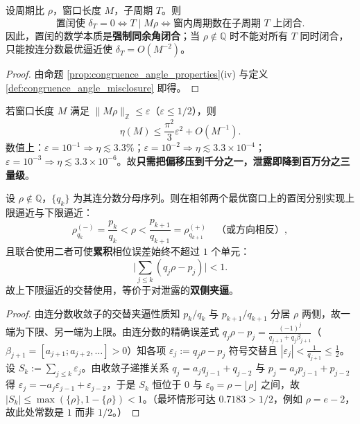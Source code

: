 \begin{theorem}[置闰即同余角闭合]\label{thm:intercalation_congruence_closure}
设周期比 $\rho$，窗口长度 $M$，子周期 $T$。则
\[
\text{置闰使 }\delta_T=0
\iff
T\mid M\rho
\iff
\text{窗内周期数在子周期 }T\text{ 上闭合}.
\]
因此，置闰的数学本质是\textbf{强制同余角闭合}；当 $\rho\notin\mathbb{Q}$ 时不能对所有 $T$ 同时闭合，只能按连分数最优逼近使 $\delta_T=O(M^{-2})$。
\end{theorem}

\begin{proof}
由命题 \ref{prop:congruence_angle_properties}(iv) 与定义 \ref{def:congruence_angle_misclosure} 即得。
\end{proof}

\begin{corollary}[泄露抑制的充分条件]\label{cor:intercalation_suppression_sufficient}
若窗口长度 $M$ 满足 $\|M\rho\|_{\mathbb{Z}}\le\varepsilon$（$\varepsilon\le1/2$），则
\[
\eta(M)\le\frac{\pi^2}{3}\varepsilon^2+O(M^{-1}).
\]
数值上：$\varepsilon=10^{-1}\Rightarrow\eta\lesssim3.3\%$；$\varepsilon=10^{-2}\Rightarrow\eta\lesssim3.3\times10^{-4}$；$\varepsilon=10^{-3}\Rightarrow\eta\lesssim3.3\times10^{-6}$。故\textbf{只需把偏移压到千分之一，泄露即降到百万分之三量级}。
\end{corollary}

\begin{proposition}[上限逼近与下限逼近的联合抑制]\label{prop:optimal_joint_suppression}
设 $\rho\notin\mathbb{Q}$，$\{q_k\}$ 为其连分数分母序列。则在相邻两个最优窗口上的置闰分别实现上限逼近与下限逼近：
\[
\rho^{(-)}_{q_k}=\frac{p_k}{q_k}<\rho<\frac{p_{k+1}}{q_{k+1}}=\rho^{(+)}_{q_{k+1}}
\quad\text{（或方向相反）},
\]
且联合使用二者可使\textbf{累积}相位误差始终不超过 $1$ 个单元：
\[
\Big|\sum_{j\le k}(q_j\rho-p_j)\Big|<1 .
\]
故上下限逼近的交替使用，等价于对泄露的\textbf{双侧夹逼}。
\end{proposition}

\begin{proof}
由连分数收敛子的交替夹逼性质知 $p_k/q_k$ 与 $p_{k+1}/q_{k+1}$ 分居 $\rho$ 两侧，故一端为下限、另一端为上限。由连分数的精确误差式 $q_j\rho-p_j=\frac{(-1)^j}{q_{j+1}+q_j\beta_{j+1}}$（$\beta_{j+1}=[a_{j+1};a_{j+2},\dots]>0$）知各项 $\varepsilon_j:=q_j\rho-p_j$ 符号交替且 $|\varepsilon_j|<\frac1{q_{j+1}}\le\frac12$。设 $S_k:=\sum_{j\le k}\varepsilon_j$。由收敛子递推关系 $q_j=a_jq_{j-1}+q_{j-2}$ 与 $p_j=a_jp_{j-1}+p_{j-2}$ 得 $\varepsilon_j=-a_j\varepsilon_{j-1}+\varepsilon_{j-2}$，于是 $S_k$ 恒位于 $0$ 与 $\varepsilon_0=\rho-\lfloor\rho\rfloor$ 之间，故 $|S_k|\le\max(\{\rho\},1-\{\rho\})<1$。（最坏情形可达 $0.7183>1/2$，例如 $\rho=e-2$，故此处常数是 $1$ 而非 $1/2$。）
\end{proof}

